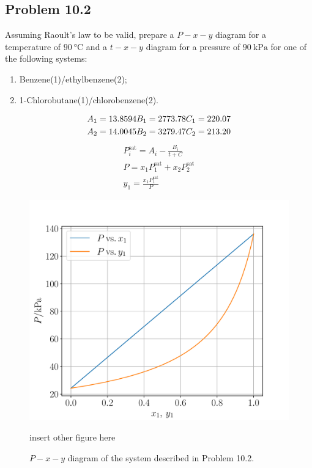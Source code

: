 \documentclass{article}
\begin{document}
\subsection*{Problem 10.2}
Assuming Raoult's law to be valid, prepare a $P-x-y$ diagram for a
temperature of $90~\unit{\degreeCelsius}$ and a $t-x-y$ diagram for a
pressure of $90~\unit{\kilo\pascal}$ for one of the following systems:
\begin{enumerate}[label=(\alph*)]
  \item Benzene(1)/ethylbenzene(2);
  \item 1-Chlorobutane(1)/chlorobenzene(2).
\end{enumerate}
\begin{solution}
  \begin{gather*}
    A_{1} = 13.8594 \hfill B_{1} = 2773.78 \hfill C_{1} = 220.07 \\
    A_{2} = 14.0045 \hfill B_{2} = 3279.47 \hfill C_{2} = 213.20 \\
  \end{gather*}
  \begin{gather*}
    P_{i}^{\text{sat}} = A_{i} - \frac{B_{i}}{t + C} \\
    P = x_{1}P_{1}^{\text{sat}} + x_{2}P_{2}^{\text{sat}} \\
    y_{1} = \frac{x_{1}P_{1}^{\text{sat}}}{P}
  \end{gather*}
  \begin{figure}[htbp]
    \centering
    \begin{minipage}[t]{0.45\textwidth}
      \centering
      \includegraphics[scale=0.3]{images/problem_10_2a.pdf}
      \caption{$P-x-y$ diagram of the system described in Problem 10.2.}
      \label{fig:p10_2}
    \end{minipage}
    \hfill
    insert other figure here
    \begin{minipage}[t]{0.45\textwidth}
    \end{minipage}
  \end{figure}
\end{solution}
\end{document}
